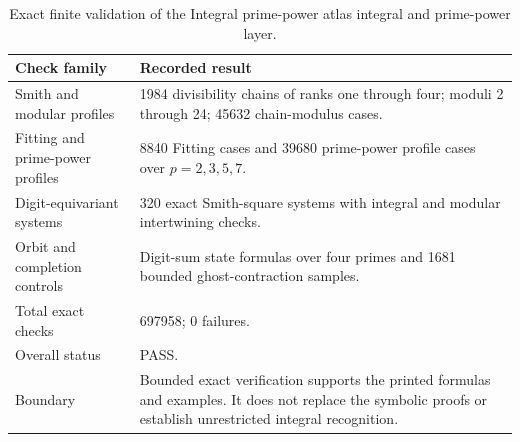 \begin{table}[htbp]
\centering
\caption{Exact finite validation of the Integral prime-power atlas integral and prime-power layer.}
\label{tab:block06-validation}
\small
\begin{tabularx}{\textwidth}{@{}L{0.31\textwidth}Y@{}}
\toprule
Check family & Recorded result\\
\midrule
Smith and modular profiles & 1984 divisibility chains of ranks one through four; moduli 2 through 24; 45632 chain-modulus cases.\\
Fitting and prime-power profiles & 8840 Fitting cases and 39680 prime-power profile cases over $p=2,3,5,7$.\\
Digit-equivariant systems & 320 exact Smith-square systems with integral and modular intertwining checks.\\
Orbit and completion controls & Digit-sum state formulas over four primes and 1681 bounded ghost-contraction samples.\\
Total exact checks & 697958; 0 failures.\\
Overall status & PASS.\\
Boundary & Bounded exact verification supports the printed formulas and examples. It does not replace the symbolic proofs or establish unrestricted integral recognition.\\
\bottomrule
\end{tabularx}
\end{table}
